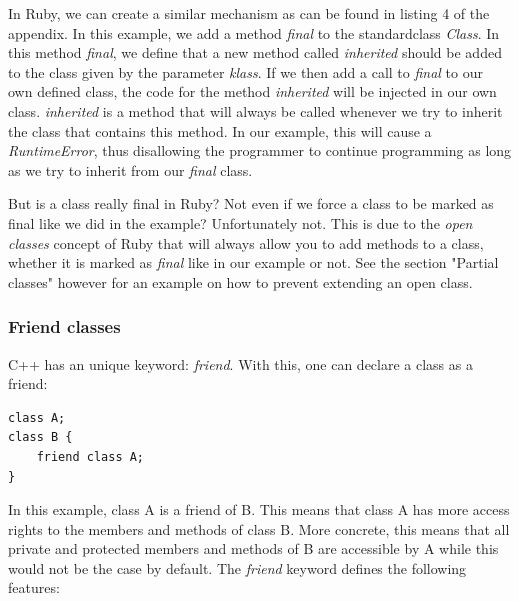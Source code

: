\documentclass[10pt,a4paper,twocolumn]{article}
\begin{document}
In Ruby, we can create a similar mechanism as can be found in listing 4 of the appendix. In this example, we add a method \textit{final} to the standardclass \textit{Class}. In this method \textit{final}, we define that a new method called \textit{inherited} should be added to the class given by the parameter \textit{klass}. If we then add a call to \textit{final} to our own defined class, the code for the method \textit{inherited} will be injected in our own class. \textit{inherited} is a method that will always be called whenever we try to inherit the class that contains this method. In our example, this will cause a \textit{RuntimeError}, thus disallowing the programmer to continue programming as long as we try to inherit from our \textit{final} class.

But is a class really final in Ruby? Not even if we force a class to be marked as final like we did in the example? Unfortunately not. This is due to the \textit{open classes} concept of Ruby that will always allow you to add methods to a class, whether it is marked as \textit{final} like in our example or not. See the section "Partial classes" however for an example on how to prevent extending an open class.

\subsubsection{Friend classes}
C++ has an unique keyword: \textit{friend}. With this, one can declare a class as a friend:

\begin{lstlisting}
class A;
class B {
	friend class A;
}
\end{lstlisting}

In this example, class A is a friend of B. This means that class A has more access rights to the members and methods of class B. More concrete, this means that all private and protected members and methods of B are accessible by A while this would not be the case by default. The \textit{friend} keyword defines the following features:
\end{document}

